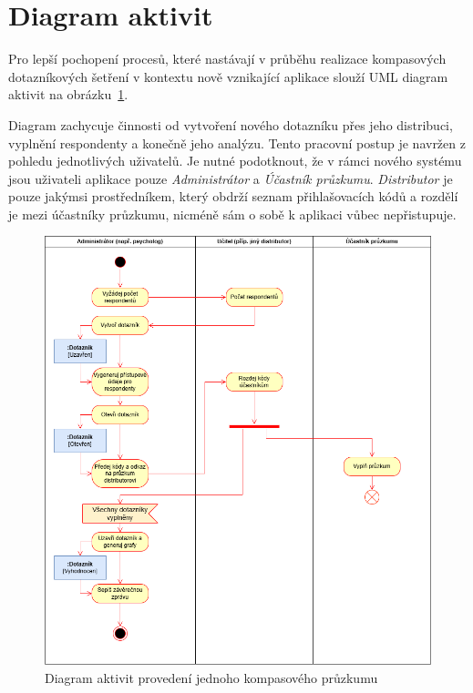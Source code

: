 \section{Diagram aktivit}
Pro lepší pochopení procesů, které nastávají v průběhu realizace kompasových
dotazníkových šetření v kontextu nově vznikající aplikace
slouží UML diagram aktivit na obrázku~\ref{fig:activity}.

Diagram zachycuje činnosti od vytvoření nového dotazníku přes jeho distribuci, vyplnění
respondenty a konečně jeho analýzu. Tento pracovní postup je navržen z pohledu jednotlivých uživatelů.
Je nutné podotknout, že v rámci nového systému jsou uživateli aplikace pouze \textit{Administrátor} a \textit{Účastník průzkumu}.
\textit{Distributor} je pouze jakýmsi prostředníkem, který obdrží seznam přihlašovacích kódů a rozdělí je mezi účastníky průzkumu, nicméně
sám o sobě k aplikaci vůbec nepřistupuje.

\begin{figure}[h!]
    \centering
    \includegraphics[width=\textwidth]{images/activity.png}
    \caption{Diagram aktivit provedení jednoho kompasového průzkumu}
    \label{fig:activity}
\end{figure}

